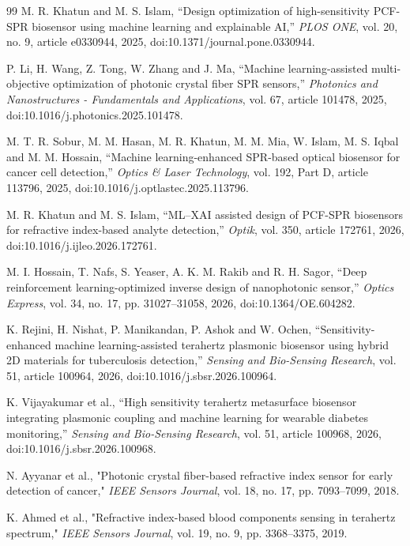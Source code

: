 \documentclass[5p,times,twocolumn]{elsarticle}
\begin{document}
\begin{thebibliography}{99}
 M. R. Khatun and M. S. Islam, ``Design optimization of high-sensitivity PCF-SPR biosensor using machine learning and explainable AI,'' \textit{PLOS ONE}, vol. 20, no. 9, article e0330944, 2025, doi:10.1371/journal.pone.0330944.

 P. Li, H. Wang, Z. Tong, W. Zhang and J. Ma, ``Machine learning-assisted multi-objective optimization of photonic crystal fiber SPR sensors,'' \textit{Photonics and Nanostructures - Fundamentals and Applications}, vol. 67, article 101478, 2025, doi:10.1016/j.photonics.2025.101478.

 M. T. R. Sobur, M. M. Hasan, M. R. Khatun, M. M. Mia, W. Islam, M. S. Iqbal and M. M. Hossain, ``Machine learning-enhanced SPR-based optical biosensor for cancer cell detection,'' \textit{Optics \& Laser Technology}, vol. 192, Part D, article 113796, 2025, doi:10.1016/j.optlastec.2025.113796.

 M. R. Khatun and M. S. Islam, ``ML--XAI assisted design of PCF-SPR biosensors for refractive index-based analyte detection,'' \textit{Optik}, vol. 350, article 172761, 2026, doi:10.1016/j.ijleo.2026.172761.

 M. I. Hossain, T. Nafs, S. Yeaser, A. K. M. Rakib and R. H. Sagor, ``Deep reinforcement learning-optimized inverse design of nanophotonic sensor,'' \textit{Optics Express}, vol. 34, no. 17, pp. 31027--31058, 2026, doi:10.1364/OE.604282.

 K. Rejini, H. Nishat, P. Manikandan, P. Ashok and W. Ochen, ``Sensitivity-enhanced machine learning-assisted terahertz plasmonic biosensor using hybrid 2D materials for tuberculosis detection,'' \textit{Sensing and Bio-Sensing Research}, vol. 51, article 100964, 2026, doi:10.1016/j.sbsr.2026.100964.

 K. Vijayakumar et al., ``High sensitivity terahertz metasurface biosensor integrating plasmonic coupling and machine learning for wearable diabetes monitoring,'' \textit{Sensing and Bio-Sensing Research}, vol. 51, article 100968, 2026, doi:10.1016/j.sbsr.2026.100968.

 N. Ayyanar et al., "Photonic crystal fiber-based refractive index sensor for early detection of cancer," \textit{IEEE Sensors Journal}, vol. 18, no. 17, pp. 7093--7099, 2018.

 K. Ahmed et al., "Refractive index-based blood components sensing in terahertz spectrum," \textit{IEEE Sensors Journal}, vol. 19, no. 9, pp. 3368--3375, 2019.


\end{thebibliography}
\end{document}
